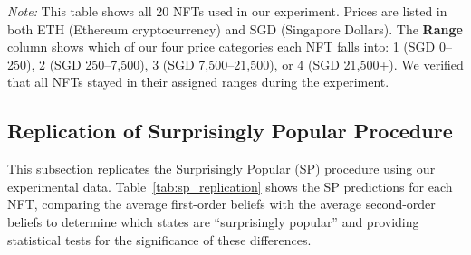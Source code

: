 \documentclass[12pt,reqno]{amsart}
\begin{document}
\begin{table}[htbp]
{\begin{minipage}{0.9\textheight}
\vspace{1em}
\noindent\textit{Note:} This table shows all 20 NFTs used in our experiment. Prices are listed in both ETH (Ethereum cryptocurrency) and SGD (Singapore Dollars). The \textbf{Range} column shows which of our four price categories each NFT falls into: 1 (SGD 0--250), 2 (SGD 250--7,500), 3 (SGD 7,500--21,500), or 4 (SGD 21,500+). We verified that all NFTs stayed in their assigned ranges during the experiment.
\end{minipage}
} %

\end{table}

\subsection{Replication of Surprisingly Popular Procedure}

 This subsection replicates the Surprisingly Popular (SP) procedure using our experimental data. Table~\ref{tab:sp_replication} shows the SP predictions for each NFT, comparing the average first-order beliefs with the average second-order beliefs to determine which states are ``surprisingly popular'' and providing statistical tests for the significance of these differences.
\end{document}
